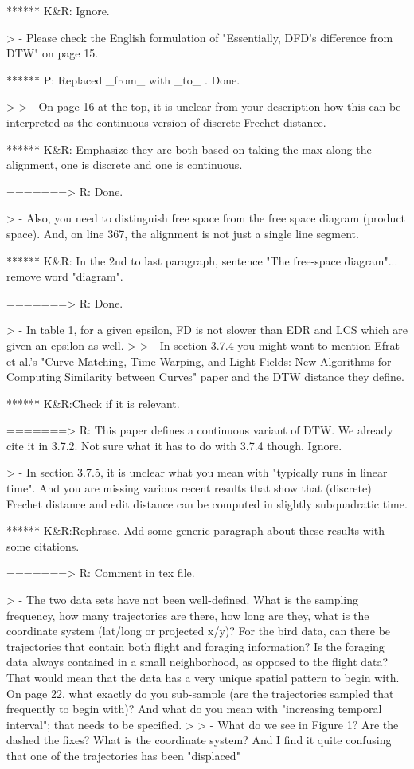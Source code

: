 ****** K&R: Ignore.


> - Please check the English formulation of "Essentially, DFD's difference from DTW" on page 15.

****** P: Replaced _from_ with _to_ . Done.

>
> - On page 16 at the top, it is unclear from your description how this can be interpreted as the continuous version of discrete Frechet distance.

****** K&R: Emphasize they are both based on taking the max along the alignment, one is discrete and one is continuous.

=======> R: Done.

> - Also, you need to distinguish free space from the free space diagram (product space). And, on line 367, the alignment is not just a single line segment.

****** K&R: In the 2nd to last paragraph, sentence "The free-space diagram"... remove word "diagram".

=======> R: Done.

> - In table 1, for a given epsilon, FD is not slower than EDR and LCS which are given an epsilon as well.
>
> - In section 3.7.4 you might want to mention Efrat et al.'s "Curve Matching, Time Warping, and Light Fields: New Algorithms for Computing Similarity between Curves" paper and the DTW distance they define.

****** K&R:Check if it is relevant.

=======> R: This paper defines a continuous variant of DTW. We already cite it in 3.7.2. Not sure what it has to do with 3.7.4 though. Ignore.

> - In section 3.7.5, it is unclear what you mean with "typically runs in linear time". And you are missing various recent results that show that (discrete) Frechet distance and edit distance can be computed in slightly subquadratic time.

****** K&R:Rephrase.  Add some generic paragraph about these results with some citations.


=======> R: Comment in tex file.


> - The two data sets have not been well-defined. What is the sampling frequency, how many trajectories are there, how long are they, what is the coordinate system (lat/long or projected x/y)? For the bird data, can there be trajectories that contain both flight and foraging information? Is the foraging data always contained in a small neighborhood, as opposed to the flight data? That would mean that the data has a very unique spatial pattern to begin with. On page 22, what exactly do you sub-sample (are the trajectories sampled that frequently to begin with)? And what do you mean with "increasing temporal interval"; that needs to be specified.
>
> - What do we see in Figure 1? Are the dashed the fixes? What is the coordinate system? And I find it quite confusing that one of the trajectories has been "displaced"


